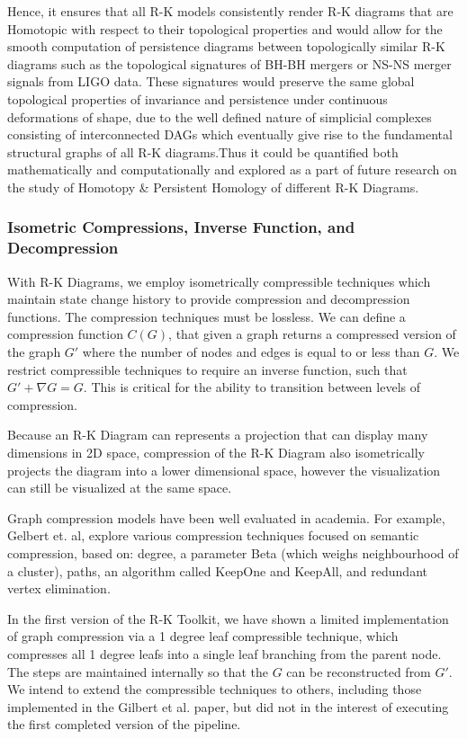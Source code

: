 Hence, it ensures that all R-K models consistently render R-K diagrams that are Homotopic with respect to their topological properties and would allow for the smooth computation of persistence diagrams between topologically similar R-K diagrams such as the topological signatures of  BH-BH mergers or NS-NS merger signals from LIGO data. These signatures would preserve the same global topological properties of invariance and persistence under continuous deformations of shape, due to the well defined nature of simplicial complexes consisting of interconnected DAGs which eventually give rise to the fundamental structural graphs of all R-K diagrams.Thus it could be quantified both mathematically and computationally and explored as a part of future research on the study of Homotopy \&  Persistent Homology of different R-K Diagrams.

\subsubsection{Isometric Compressions, Inverse Function, and Decompression}

With R-K Diagrams, we employ isometrically compressible techniques which maintain state change history to provide compression and decompression functions. The compression techniques must be lossless. We can define a compression function $C(G)$, that given a graph returns a compressed version of the graph $G\prime$ where the number of nodes and edges is equal to or less than $G$. We restrict compressible techniques to require an inverse function, such that $G\prime + \nabla{G} = G$. This is critical for the ability to transition between levels of compression.

Because an R-K Diagram can represents a projection that can display many dimensions in 2D space, compression of the R-K Diagram also isometrically projects the diagram into a lower dimensional space, however the visualization can still be visualized at the same space.

Graph compression models have been well evaluated in academia. For example, Gelbert et. al, \cite{gilbert_levchenko} explore various compression techniques focused on semantic compression, based on: degree, a parameter Beta (which weighs neighbourhood of a cluster), paths, an algorithm called KeepOne and KeepAll, and redundant vertex elimination. \cite{gilbert_levchenko}

In the first version of the R-K Toolkit, we have shown a limited implementation of graph compression via a 1 degree leaf compressible technique, which compresses all 1 degree leafs into a single leaf branching from the parent node. The steps are maintained internally so that the $G$ can be reconstructed from $G\prime$. We intend to extend the compressible techniques to others, including those implemented in the Gilbert et al. paper, but did not in the interest of executing the first completed version of the pipeline.

